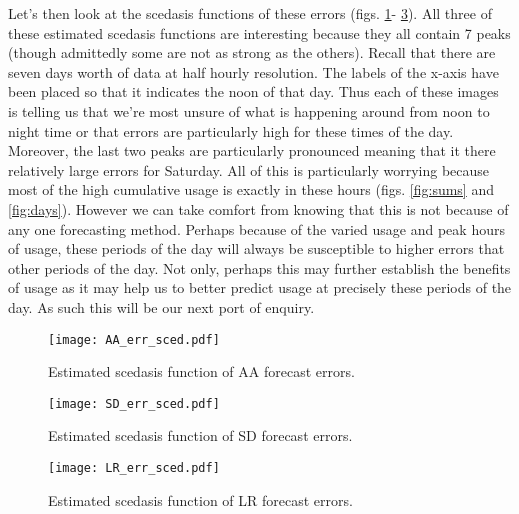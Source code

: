 Let's then look at the scedasis functions of these errors (figs. \ref{fig:AA_err_sced}- \ref{fig:LR_err_sced}). All three of these estimated scedasis functions are interesting because they all contain 7 peaks (though admittedly some are not as strong as the others). Recall that there are seven days worth of data at half hourly resolution. The labels of the x-axis have been placed so that it indicates the noon of that day. Thus each of these images is telling us that we're most unsure of what is happening around from noon to night time or that errors are particularly high for these times of the day. Moreover, the last two peaks are particularly pronounced meaning that it there relatively large errors for Saturday. All of this is particularly worrying because most of the high cumulative usage is exactly in these hours (figs. \ref{fig:sums} and \ref{fig:days}). However we can take comfort from knowing that this is not because of any one forecasting method. Perhaps because of the varied usage and peak hours of usage, these periods of the day will always be susceptible to higher errors that other periods of the day. Not only, perhaps this may further establish the benefits of usage as it may help us to better predict usage at precisely these periods of the day. As such this will be our next port of enquiry.

\begin{figure}
\centering
\texttt{[image: AA\_err\_sced.pdf]}
\caption{\label{fig:AA_err_sced} Estimated scedasis function of AA forecast errors.}
\end{figure}

\begin{figure}
\centering
\texttt{[image: SD\_err\_sced.pdf]}
\caption{\label{fig:SD_err_sced} Estimated scedasis function of SD forecast errors.}
\end{figure}

\begin{figure}
\centering
\texttt{[image: LR\_err\_sced.pdf]}
\caption{\label{fig:LR_err_sced} Estimated scedasis function of LR forecast errors.}
\end{figure}



